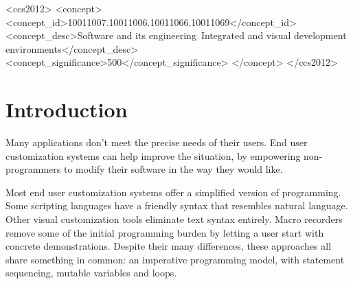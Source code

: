 \documentclass[sigplan,screen,10pt,anonymous,review]{acmart}
\begin{document}
\begin{CCSXML}
<ccs2012>
<concept>
<concept_id>10011007.10011006.10011066.10011069</concept_id>
<concept_desc>Software and its engineering~Integrated and visual development environments</concept_desc>
<concept_significance>500</concept_significance>
</concept>
</ccs2012>
\end{CCSXML}




\maketitle

\hypertarget{introduction}{%
\section{Introduction}\label{introduction}}

Many applications don't meet the precise needs of their users. End user
customization systems can help improve the situation, by empowering
non-programmers to modify their software in the way they would like.

Most end user customization systems offer a simplified version of
programming. Some scripting languages \citep{bolin2005, cook2007} have a
friendly syntax that resembles natural language. Other visual
customization tools eliminate text syntax entirely. Macro recorders
\citep{cook2007, chasins2018, anupam2000} remove some of the initial
programming burden by letting a user start with concrete demonstrations.
Despite their many differences, these approaches all share something in
common: an imperative programming model, with statement sequencing,
mutable variables and loops.
\end{document}
